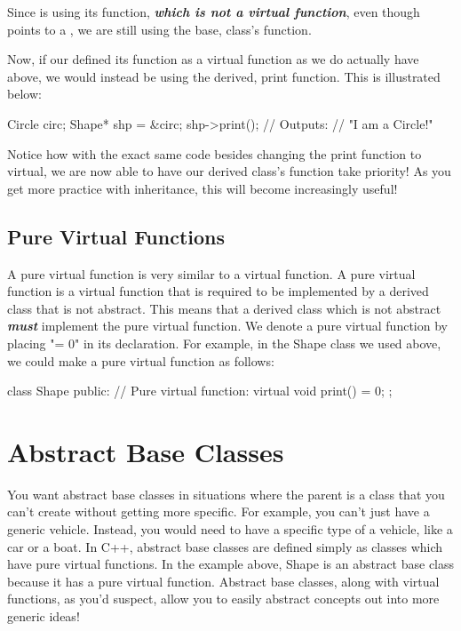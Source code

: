 \documentclass{tufte-handout}
\begin{document}
Since  is using its  function, \textit{\textbf{which is not a virtual function}}, even though  points to a , we are still using the base,  class's  function.

Now, if our  defined its  function as a virtual function as we do actually have above, we would instead be using the derived,  print function.
This is illustrated below:

\begin{Code}
    Circle circ;
    Shape* shp = &circ;
    shp->print();
    // Outputs:
    // "I am a Circle!"
\end{Code}
Notice how with the exact same code besides changing the print function to virtual, we are now able to have our derived class's function take priority!
As you get more practice with inheritance, this will become increasingly useful!

\subsection{Pure Virtual Functions}
A pure virtual function is very similar to a virtual function.
A pure virtual function is a virtual function that is required to be implemented by a derived class that is not abstract.
This means that a derived class which is not abstract \textbf{\textit{must}} implement the pure virtual function. We denote a pure virtual function by placing "= 0" in its declaration. For example, in the Shape class we used above, we could make  a pure virtual function as follows:
\begin{Code}
class Shape{
    public:
        // Pure virtual function:
        virtual void print() = 0;
};
\end{Code}

\section{Abstract Base Classes}
You want abstract base classes in situations where the parent is a class that you can't create without getting more specific.
For example, you can't just have a generic vehicle.
Instead, you would need to have a specific type of a vehicle, like a car or a boat.
In C++, abstract base classes are defined simply as classes which have pure virtual functions.
In the example above, Shape is an abstract base class because it has a pure virtual function.
Abstract base classes, along with virtual functions, as you'd suspect, allow you to easily abstract concepts out into more generic ideas!
\end{document}
